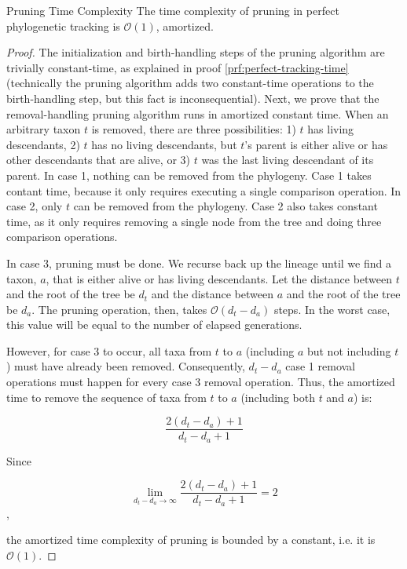 \begin{theorem}{Pruning Time Complexity}
\label{thm:perfect-tracking-with-pruning-time}
The time complexity of pruning in perfect phylogenetic tracking is $\mathcal{O}(1)$, amortized. 
\end{theorem}

\begin{proof}
\label{prf:perfect-tracking-with-pruning-time}
The initialization and birth-handling steps of the pruning algorithm are trivially constant-time, as explained in proof \ref{prf:perfect-tracking-time} (technically the pruning algorithm adds two constant-time operations to the birth-handling step, but this fact is inconsequential).
Next, we prove that the removal-handling pruning algorithm runs in amortized constant time.
When an arbitrary taxon $t$ is removed, there are three possibilities: 1) $t$ has living descendants, 2) $t$ has no living descendants, but $t$'s parent is either alive or has other descendants that are alive, or 3) $t$ was the last living descendant of its parent.
In case 1, nothing can be removed from the phylogeny.
Case 1 takes contant time, because it only requires executing a single comparison operation.
In case 2, only $t$ can be removed from the phylogeny.
Case 2 also takes constant time, as it only requires removing a single node from the tree and doing three comparison operations.

In case 3, pruning must be done.
We recurse back up the lineage until we find a taxon, $a$, that is either alive or has living descendants. 
Let the distance between $t$ and the root of the tree be $d_t$ and the distance between $a$ and the root of the tree be $d_a$.
The pruning operation, then, takes $\mathcal{O}(d_t - d_a)$ steps. 
In the worst case, this value will be equal to the number of elapsed generations.

However, for case 3 to occur, all taxa from $t$ to $a$ (including $a$ but not including $t$) must have already been removed.
Consequently, $d_t - d_a$ case 1 removal operations must happen for every case 3 removal operation.
Thus, the amortized time to remove the sequence of taxa from $t$ to $a$ (including both $t$ and $a$) is:

\[
\frac{2(d_t - d_a) + 1}{d_t - d_a + 1}
\]

Since

\[
\lim_{d_t - d_a\to\infty} \frac{2(d_t - d_a) + 1}{d_t - d_a + 1} = 2
\],

the amortized time complexity of pruning is bounded by a constant, i.e. it is $\mathcal{O}(1)$.


\end{proof}

